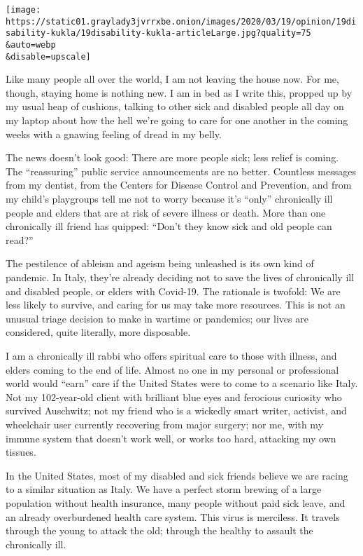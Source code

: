 \texttt{[image: https://static01.graylady3jvrrxbe.onion/images/2020/03/19/opinion/19disability-kukla/19disability-kukla-articleLarge.jpg?quality=75\\\&auto=webp\\\&disable=upscale]}

Like many people all over the world, I am not leaving the house now. For
me, though, staying home is nothing new. I am in bed as I write this,
propped up by my usual heap of cushions, talking to other sick and
disabled people all day on my laptop about how the hell we're going to
care for one another in the coming weeks with a gnawing feeling of dread
in my belly.

The news doesn't look good: There are more people sick; less relief is
coming. The ``reassuring'' public service announcements are no better.
Countless messages from my dentist, from the Centers for Disease Control
and Prevention, and from my child's playgroups tell me not to worry
because it's ``only'' chronically ill people and elders that are at risk
of severe illness or death. More than one chronically ill friend has
quipped: ``Don't they know sick and old people can read?''

The pestilence of ableism and ageism being unleashed is its own kind of
pandemic. In Italy, they're already deciding not to save the lives of
chronically ill and disabled people, or elders with Covid-19. The
rationale is twofold: We are less likely to survive, and caring for us
may take more resources. This is not an unusual triage decision to make
in wartime or pandemics; our lives are considered, quite literally, more
disposable.

I am a chronically ill rabbi who offers spiritual care to those with
illness, and elders coming to the end of life. Almost no one in my
personal or professional world would ``earn'' care if the United States
were to come to a scenario like Italy. Not my 102-year-old client with
brilliant blue eyes and ferocious curiosity who survived Auschwitz; not
my friend who is a wickedly smart writer, activist, and wheelchair user
currently recovering from major surgery; nor me, with my immune system
that doesn't work well, or works too hard, attacking my own tissues.

In the United States, most of my disabled and sick friends believe we
are racing to a similar situation as Italy. We have a perfect storm
brewing of a large population without health insurance, many people
without paid sick leave, and an already overburdened health care system.
This virus is merciless. It travels through the young to attack the old;
through the healthy to assault the chronically ill.

